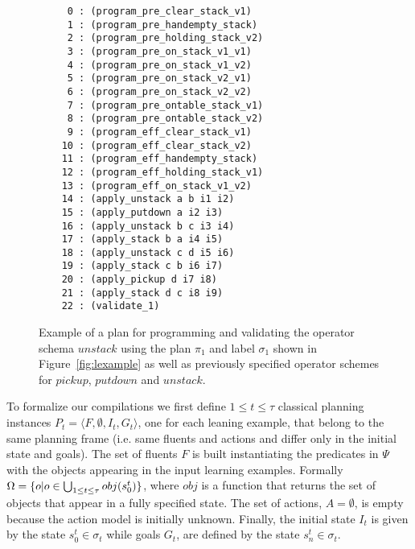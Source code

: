 \documentclass[letterpaper]{article} %
\newcommand{\tup}[1]{{\langle #1 \rangle}}
\begin{document}
\begin{figure}[hbt]
\begin{small}
\begin{verbatim}
     0 : (program_pre_clear_stack_v1)
     1 : (program_pre_handempty_stack)
     2 : (program_pre_holding_stack_v2)
     3 : (program_pre_on_stack_v1_v1)
     4 : (program_pre_on_stack_v1_v2)
     5 : (program_pre_on_stack_v2_v1)
     6 : (program_pre_on_stack_v2_v2)
     7 : (program_pre_ontable_stack_v1)
     8 : (program_pre_ontable_stack_v2)
     9 : (program_eff_clear_stack_v1)
    10 : (program_eff_clear_stack_v2)
    11 : (program_eff_handempty_stack)
    12 : (program_eff_holding_stack_v1)
    13 : (program_eff_on_stack_v1_v2)
    14 : (apply_unstack a b i1 i2)
    15 : (apply_putdown a i2 i3)
    16 : (apply_unstack b c i3 i4)
    17 : (apply_stack b a i4 i5)
    18 : (apply_unstack c d i5 i6)
    19 : (apply_stack c b i6 i7)
    20 : (apply_pickup d i7 i8)
    21 : (apply_stack d c i8 i9)
    22 : (validate_1)
\end{verbatim}
\end{small}
 \caption{\small Example of a plan for programming and validating the operator schema $unstack$ using the plan $\pi_1$ and label $\sigma_1$ shown in Figure~\ref{fig:lexample} as well as previously specified operator schemes for $pickup$, $putdown$ and $unstack$.}
\label{fig:plan}
\end{figure}

To formalize our compilations we first define {\small $1\leq t\leq \tau$} classical planning instances $P_t=\tup{F,\emptyset,I_t,G_t}$, one for each leaning example, that belong to the same planning frame (i.e. same fluents and actions and differ only in the initial state and goals). The set of fluents $F$ is built instantiating the predicates in $\Psi$ with the objects appearing in the input learning examples. Formally $\Omega=\{o|o\in \bigcup_{\small 1\leq t\leq \tau} obj(s_0^t)\}$, where $obj$ is a function that returns the set of objects that appear in a fully specified state. The set of actions, $A=\emptyset$, is empty because the action model is initially unknown. Finally, the initial state $I_t$ is given by the state $s_0^t\in \sigma_t$ while goals $G_t$, are defined by the state $s_n^t\in \sigma_t$.
\end{document}
